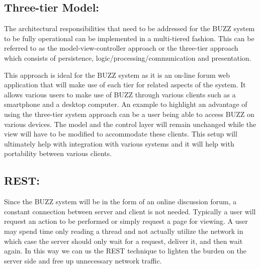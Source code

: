 \subsection{Three-tier Model:}
The architectural responsibilities that need to be addressed for the BUZZ system to be fully operational can be implemented in a multi-tiered fashion. This can be referred to as the model-view-controller approach or the three-tier approach which consists of persistence, logic/processing/communication and presentation. 

This approach is ideal for the BUZZ system as it is an on-line forum web application that will make use of each tier for related aspects of the system. It allows various users to make use of BUZZ through various clients such as a smartphone and a desktop computer. An example to highlight an advantage of using the three-tier system approach can be a user being able to access BUZZ on various devices. The model and the control layer will remain unchanged while the view will have to be modified to accommodate these clients.  This setup will ultimately help with integration with various systems and it will help with portability between various clients.

\subsection{REST:}
 Since the BUZZ system will be in the form of an online discussion forum, a constant connection between server and client is not needed. Typically a user will request an action to be performed or simply request a page for viewing. A user may spend time only reading a thread and not actually utilize the network in which case the server should only wait for a request, deliver it, and then wait again. In this way we can us the REST technique to lighten the burden on the server side and free up unnecessary network traffic.
